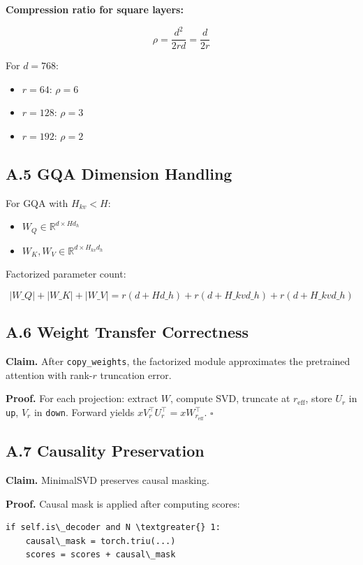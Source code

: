 \textbf{Compression ratio for square layers:}

\[
\rho = \frac{d^2}{2rd} = \frac{d}{2r}
\tag{A.3}
\]

For $d = 768$:
\begin{itemize}
\item $r = 64$: $\rho = 6$
\item $r = 128$: $\rho = 3$
\item $r = 192$: $\rho = 2$

\end{itemize}
\subsection{A.5 GQA Dimension Handling}

For GQA with $H_{kv} < H$:
\begin{itemize}
\item $W_Q \in \mathbb{R}^{d \times H d_h}$
\item $W_K, W_V \in \mathbb{R}^{d \times H_{kv} d_h}$

\end{itemize}
Factorized parameter count:

\[
|W\_Q| + |W\_K| + |W\_V| = r(d + H d\_h) + r(d + H\_{kv} d\_h) + r(d + H\_{kv} d\_h)
\tag{A.4}
\]

\subsection{A.6 Weight Transfer Correctness}

\textbf{Claim.} After \texttt{copy\_weights}, the factorized module approximates the 
pretrained attention with rank-$r$ truncation error.

\textbf{Proof.} For each projection: extract $W$, compute SVD, truncate at 
$r_\text{eff}$, store $U_r$ in \texttt{up}, $V_r$ in \texttt{down}. Forward yields 
$x V_r^\top U_r^\top = x W_{r_\text{eff}}^\top$. $\square$

\subsection{A.7 Causality Preservation}

\textbf{Claim.} MinimalSVD preserves causal masking.

\textbf{Proof.} Causal mask is applied after computing scores:

\begin{lstlisting}
if self.is\_decoder and N \textgreater{} 1:
    causal\_mask = torch.triu(...)
    scores = scores + causal\_mask
\end{lstlisting}


